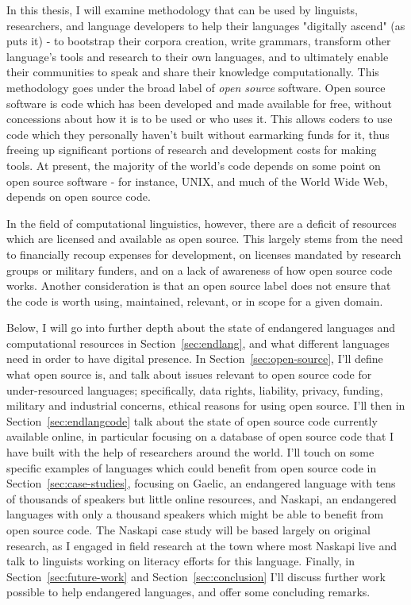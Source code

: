 In this thesis, I will examine methodology that can be used by linguists, researchers, and language developers to help their languages "digitally ascend" (as \citet{kornai2013digital} puts it) - to bootstrap their corpora creation, write grammars, transform other language's tools and research to their own languages, and to ultimately enable their communities to speak and share their knowledge computationally. This methodology goes under the broad label of \textit{open source} software. Open source software is code which has been developed and made available for free, without concessions about how it is to be used or who uses it. This allows coders to use code which they personally haven't built without earmarking funds for it, thus freeing up significant portions of research and development costs for making tools. At present, the majority of the world's code depends on some point on open source software - for instance, UNIX, and much of the World Wide Web, depends on open source code.

In the field of computational linguistics, however, there are a deficit of resources which are licensed and available as open source. This largely stems from the need to financially recoup expenses for development, on licenses mandated by research groups or military funders, and on a lack of awareness of how open source code works. Another consideration is that an open source label does not ensure that the code is worth using, maintained, relevant, or in scope for a given domain.


Below, I will go into further depth about the state of endangered languages and computational resources in Section~\ref{sec:endlang}, and what different languages need in order to have digital presence. In Section~\ref{sec:open-source}, I'll define what open source is, and talk about issues relevant to open source code for under-resourced languages; specifically, data rights, liability, privacy, funding, military and industrial concerns, ethical reasons for using open source. I'll then in Section~\ref{sec:endlangcode} talk about the state of open source code currently available online, in particular focusing on a database of open source code that I have built with the help of researchers around the world. I'll touch on some specific examples of languages which could benefit from open source code in Section~\ref{sec:case-studies}, focusing on Gaelic, an endangered language with tens of thousands of speakers but little online resources, and Naskapi, an endangered languages with only a thousand speakers which might be able to benefit from open source code. The Naskapi case study will be based largely on original research, as I engaged in field research at the town where most Naskapi live and talk to linguists working on literacy efforts for this language. Finally, in Section~\ref{sec:future-work} and Section~\ref{sec:conclusion} I'll discuss further work possible to help endangered languages, and offer some concluding remarks.
